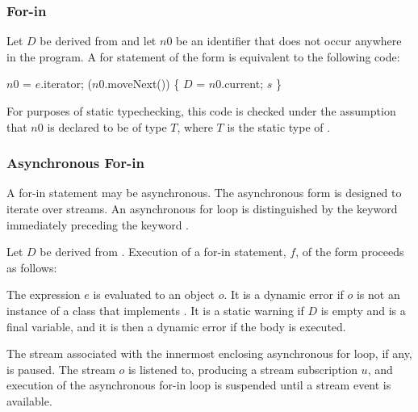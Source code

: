 \documentclass{article}
\begin{document}
\subsubsection{For-in}

\LMHash{}
Let $D$ be derived from 
and let $n0$ be an identifier that does not occur anywhere in the program.
A for statement of the form  is equivalent to the following code:

\begin{dartCode}
\VAR{} $n0$ = $e$.iterator;
\WHILE{} ($n0$.moveNext()) \{
   $D$ \id{} = $n0$.current;
   $s$
\}
\end{dartCode}

For purposes of static typechecking,
this code is checked under the assumption that $n0$ is declared to be of type $T$,
where $T$ is the static type of .



\subsubsection{Asynchronous For-in}

\LMHash{}
A for-in statement may be asynchronous.
The asynchronous form is designed to iterate over streams.
An asynchronous for loop is distinguished by the keyword \AWAIT{} immediately preceding the keyword \FOR.

\LMHash{}
Let $D$ be derived from .
Execution of a for-in statement, $f$, of the form
proceeds as follows:

\LMHash{}
The expression $e$ is evaluated to an object $o$.
It is a dynamic error if $o$ is not an instance of a class that implements .
It is a static warning if $D$ is empty and \id{} is a final variable,
and it is then a dynamic error if the body is executed.

\LMHash{}
The stream associated with the innermost enclosing asynchronous for loop, if any, is paused.
The stream $o$ is listened to, producing a stream subscription $u$,
and execution of the asynchronous for-in loop is suspended
until a stream event is available.
\end{document}
